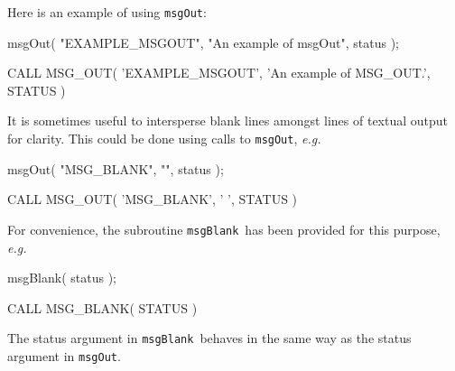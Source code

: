 \documentclass[twoside,11pt]{starlink}
\providecommand{\func}[1]{\texttt{#1}}
\providecommand{\msgblank}{\func{msgBlank}}
\providecommand{\msgout}{\func{msgOut}}
\begin{document}
Here is an example of using \msgout:
\begin {small}
\begin{terminalv}
      msgOut( "EXAMPLE_MSGOUT", "An example of msgOut", status );

      CALL MSG_OUT( 'EXAMPLE_MSGOUT', 'An example of MSG_OUT.', STATUS )
\end{terminalv}
\end {small}
It is sometimes useful to intersperse blank lines amongst lines of textual
output for clarity.
This could be done using calls to \msgout, \textit{e.g.}
\begin {small}
\begin{terminalv}
      msgOut( "MSG_BLANK", "", status );

      CALL MSG_OUT( 'MSG_BLANK', ' ', STATUS )
\end{terminalv}
\end {small}
For convenience, the subroutine \msgblank\ has been provided for this
purpose, \textit{e.g.}
\begin {small}
\begin{terminalv}
      msgBlank( status );

      CALL MSG_BLANK( STATUS )
\end{terminalv}
\end {small}
The status argument in \msgblank\ behaves in the same way as the status
argument in \msgout.
\end{document}
